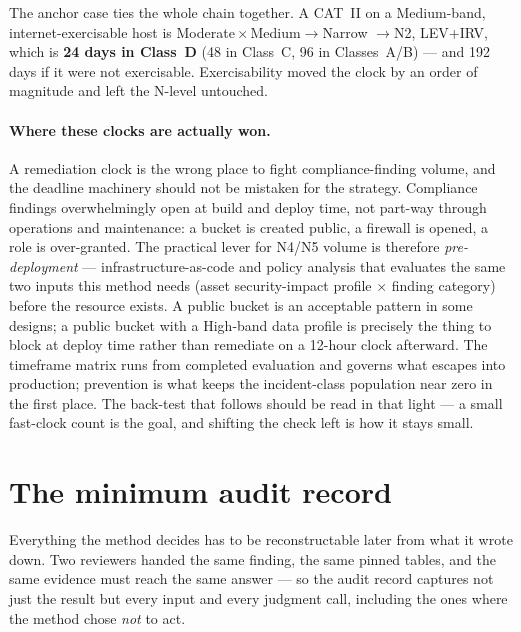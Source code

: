 \documentclass[11pt]{article}
\begin{document}
The anchor case ties the whole chain together. A CAT~II on a Medium-band,
internet-exercisable host is Moderate${}\times{}$Medium${}\rightarrow{}$Narrow
${}\rightarrow{}$N2, LEV+IRV, which is \textbf{24 days in Class~D} (48 in Class~C, 96
in Classes~A/B) --- and 192 days if it were not exercisable. Exercisability moved the
clock by an order of magnitude and left the N-level untouched.

\paragraph{Where these clocks are actually won.} A remediation clock is the wrong
place to fight compliance-finding volume, and the deadline machinery should not be
mistaken for the strategy. Compliance findings overwhelmingly open at build and deploy
time, not part-way through operations and maintenance: a bucket is created public, a
firewall is opened, a role is over-granted. The practical lever for N4/N5 volume is
therefore \emph{pre-deployment} --- infrastructure-as-code and policy analysis that
evaluates the same two inputs this method needs (asset security-impact profile
$\times$ finding category) before the resource exists. A public bucket is an
acceptable pattern in some designs; a public bucket with a High-band data profile
is precisely the thing to block at deploy time rather than remediate on a 12-hour
clock afterward. The timeframe
matrix runs from completed evaluation and governs what escapes into production;
prevention is what keeps the incident-class population near zero in the first place.
The back-test that follows should be read in that light --- a small fast-clock count
is the goal, and shifting the check left is how it stays small.

\section{The minimum audit record}
\label{sec:audit}
\begin{plain}
Everything the method decides has to be reconstructable later from what it wrote down.
Two reviewers handed the same finding, the same pinned tables, and the same evidence
must reach the same answer --- so the audit record captures not just the result but
every input and every judgment call, including the ones where the method chose
\emph{not} to act.
\end{plain}
\end{document}
